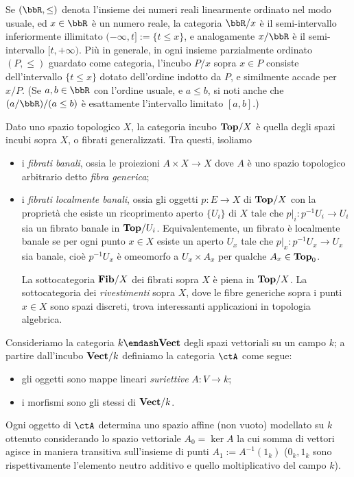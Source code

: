 \begin{example}[Intervalli]\label{ex_pos_slices}
	Se \((\bbR,\le)\) denota l'insieme dei numeri reali linearmente ordinato nel modo usuale, ed \(x\in\bbR\) è un numero reale, la categoria \(\bbR/x\) è il semi-intervallo inferiormente illimitato \((-\infty,t]:=\{t\le x\}\), e analogamente \(x/\bbR\) è il semi-intervallo \([t,+\infty)\). Più in generale, in ogni insieme parzialmente ordinato \((P,\le)\) guardato come categoria, l'incubo \(P/x\) sopra \(x\in P\) consiste dell'intervallo \(\{t\le x\}\) dotato dell'ordine indotto da \(P\), e similmente accade per \(x/P\). (Se \(a,b\in\bbR\) con l'ordine usuale, e \(a\le b\), si noti anche che \((a/\bbR)/(a\le b)\) è esattamente l'intervallo limitato \([a,b]\).)
\end{example}
\begin{example}\label{ex_fibrati_rivestimenti}
	Dato uno spazio topologico \(X\), la categoria incubo \(\mathbf{Top}/X\) è quella degli spazi incubi sopra \(X\), o fibrati generalizzati. Tra questi, isoliamo
	\begin{itemize}
		\item i \emph{fibrati banali}, ossia le proiezioni \(A\times X \to X\) dove \(A\) è uno spazio topologico arbitrario detto \emph{fibra generica};
		\item i \emph{fibrati localmente banali}, ossia gli oggetti \(p : E\to X\) di \(\mathbf{Top}/X\) con la proprietà che esiste un ricoprimento aperto \(\{U_i\}\) di \(X\) tale che \(p|_i : p^{-1}U_i\to U_i\) sia un fibrato banale in \(\mathbf{Top}/U_i\). Equivalentemente, un fibrato è localmente banale se per ogni punto \(x\in X\) esiste un aperto \(U_x\) tale che \(p|_x : p^{-1}U_x\to U_x\) sia banale, cioè \(p^{-1}U_x\) è omeomorfo a \(U_x\times A_x\) per qualche \(A_x\in\mathbf{Top}_0\).

		      La sottocategoria \(\mathbf{Fib}/X\) dei fibrati sopra \(X\) è piena in \(\mathbf{Top}/X\). La sottocategoria dei \emph{rivestimenti} sopra \(X\), dove le fibre generiche sopra i punti \(x\in X\) sono spazi discreti, trova interessanti applicazioni in topologia algebrica.
	\end{itemize}
\end{example}
\begin{example}\label{ex_affini}
	Consideriamo la categoria \(k\emdash\ctVect\) degli spazi vettoriali su un campo \(k\); a partire dall'incubo \(\mathbf{Vect}/k\) definiamo la categoria \(\ctA\) come segue:
	\begin{itemize}
		\item gli oggetti sono mappe lineari \emph{suriettive} \(A : V\to k\);
		\item i morfismi sono gli stessi di \(\mathbf{Vect}/k\).
	\end{itemize}
	Ogni oggetto di \(\ctA\) determina uno spazio affine (non vuoto) modellato su \(k\) ottenuto considerando lo spazio vettoriale \(A_0 = \ker A\) la cui somma di vettori agisce in maniera transitiva sull'insieme di punti \(A_1 := A^{-1}(1_k)\) (\(0_k,1_k\) sono rispettivamente l'elemento neutro additivo e quello moltiplicativo del campo \(k\)).
\end{example}
